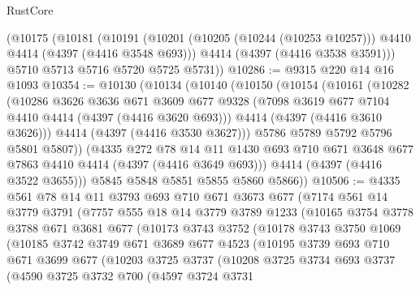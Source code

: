 \begin{lexlean}{RustCore}
\begin{coremodule}
    (@10175
      (@10181
        (@10191
          (@10201 (@10205 (@10244 (@10253 @10257))) @4410 @4414 (@4397 (@4416 @3548 @693)))
          @4414
          (@4397 (@4416 @3538 @3591)))
        @5710
        @5713
        @5716
        @5720
        @5725
        @5731))
@10286 := @9315 @220 @14 @16 @1093
@10354 := @10130
    (@10134
      (@10140
        (@10150
          (@10154
            (@10161
              (@10282
                (@10286
                  @3626
                  @3636
                  @671
                  @3609
                  @677
                  @9328
                  (@7098 @3619 @677 @7104 @4410 @4414 (@4397 (@4416 @3620 @693)))
                  @4414
                  (@4397 (@4416 @3610 @3626)))
                @4414
                (@4397 (@4416 @3530 @3627)))
              @5786
              @5789
              @5792
              @5796
              @5801
              @5807))
          (@4335
            @272
            @78
            @14
            @11
            @1430
            @693
            @710
            @671
            @3648
            @677
            @7863
            @4410
            @4414
            (@4397 (@4416 @3649 @693)))
          @4414
          (@4397 (@4416 @3522 @3655)))
        @5845
        @5848
        @5851
        @5855
        @5860
        @5866))
@10506 := @4335
    @561
    @78
    @14
    @11
    @3793
    @693
    @710
    @671
    @3673
    @677
    (@7174
      @561
      @14
      @3779
      @3791
      (@7757
        @555
        @18
        @14
        @3779
        @3789
        @1233
        (@10165
          @3754
          @3778
          @3788
          @671
          @3681
          @677
          (@10173
            @3743
            @3752
            (@10178
              @3743
              @3750
              @1069
              (@10185
                @3742
                @3749
                @671
                @3689
                @677
                @4523
                (@10195
                  @3739
                  @693
                  @710
                  @671
                  @3699
                  @677
                  (@10203
                    @3725
                    @3737
                    (@10208
                      @3725
                      @3734
                      @693
                      @3737
                      (@4590
                        @3725
                        @3732
                        @700
                        (@4597
                          @3724
                          @3731

\end{coremodule}
\end{lexlean}
